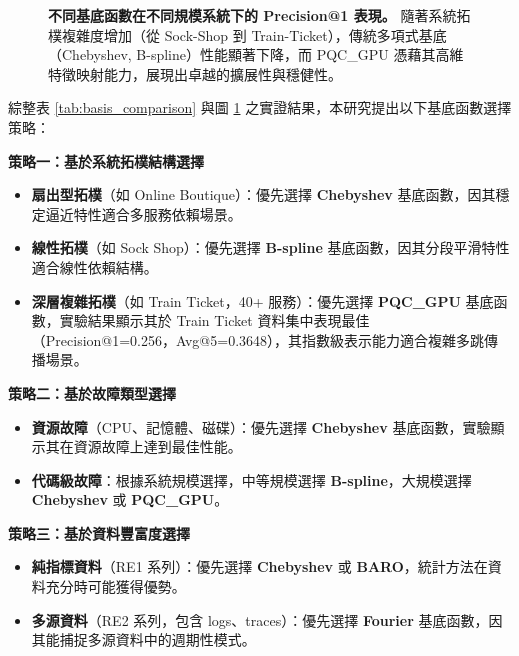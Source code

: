 \documentclass[10pt,a4paper,twocolumn]{article}
\begin{document}
\begin{figure}[t!]
    \centering
    \caption{\textbf{不同基底函數在不同規模系統下的 Precision@1 表現。} 隨著系統拓樸複雜度增加（從 Sock-Shop 到 Train-Ticket），傳統多項式基底（Chebyshev, B-spline）性能顯著下降，而 PQC\_GPU 憑藉其高維特徵映射能力，展現出卓越的擴展性與穩健性。}
    \label{fig:scalability}
\end{figure}

綜整表 \ref{tab:basis_comparison} 與圖 \ref{fig:scalability} 之實證結果，本研究提出以下基底函數選擇策略：

\textbf{策略一：基於系統拓樸結構選擇}
\begin{itemize}
\item \textbf{扇出型拓樸}（如 Online Boutique）：優先選擇 \textbf{Chebyshev} 基底函數，因其穩定逼近特性適合多服務依賴場景。
\item \textbf{線性拓樸}（如 Sock Shop）：優先選擇 \textbf{B-spline} 基底函數，因其分段平滑特性適合線性依賴結構。
\item \textbf{深層複雜拓樸}（如 Train Ticket，40+ 服務）：優先選擇 \textbf{PQC\_GPU} 基底函數，實驗結果顯示其於 Train Ticket 資料集中表現最佳（Precision@1=0.256，Avg@5=0.3648），其指數級表示能力適合複雜多跳傳播場景。
\end{itemize}

\textbf{策略二：基於故障類型選擇}
\begin{itemize}
\item \textbf{資源故障}（CPU、記憶體、磁碟）：優先選擇 \textbf{Chebyshev} 基底函數，實驗顯示其在資源故障上達到最佳性能。
\item \textbf{代碼級故障}：根據系統規模選擇，中等規模選擇 \textbf{B-spline}，大規模選擇 \textbf{Chebyshev} 或 \textbf{PQC\_GPU}。
\end{itemize}

\textbf{策略三：基於資料豐富度選擇}
\begin{itemize}
\item \textbf{純指標資料}（RE1 系列）：優先選擇 \textbf{Chebyshev} 或 \textbf{BARO}，統計方法在資料充分時可能獲得優勢。
\item \textbf{多源資料}（RE2 系列，包含 logs、traces）：優先選擇 \textbf{Fourier} 基底函數，因其能捕捉多源資料中的週期性模式。
\end{itemize}
\end{document}
